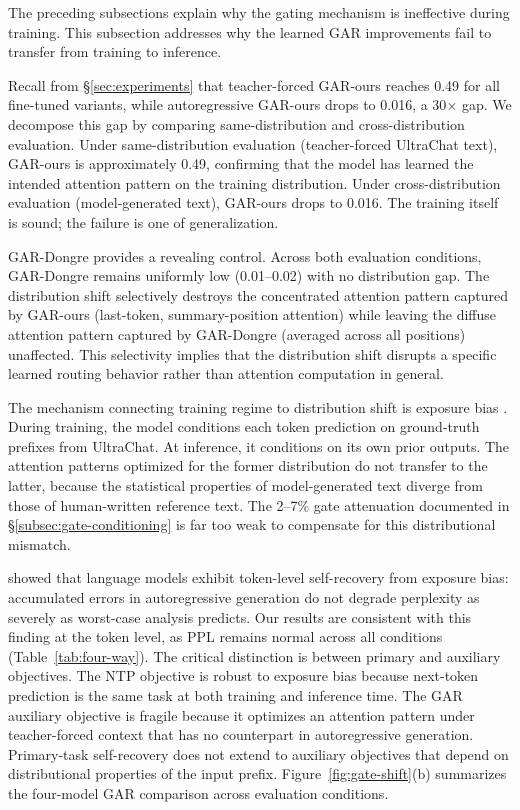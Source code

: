 The preceding subsections explain why the gating mechanism is ineffective during training. This subsection addresses why the learned GAR improvements fail to transfer from training to inference.

Recall from \S\ref{sec:experiments} that teacher-forced GAR-ours reaches 0.49 for all fine-tuned variants, while autoregressive GAR-ours drops to 0.016, a 30$\times$ gap. We decompose this gap by comparing same-distribution and cross-distribution evaluation. Under same-distribution evaluation (teacher-forced UltraChat text), GAR-ours is approximately 0.49, confirming that the model has learned the intended attention pattern on the training distribution. Under cross-distribution evaluation (model-generated text), GAR-ours drops to 0.016. The training itself is sound; the failure is one of generalization.

GAR-Dongre provides a revealing control. Across both evaluation conditions, GAR-Dongre remains uniformly low (0.01--0.02) with no distribution gap. The distribution shift selectively destroys the concentrated attention pattern captured by GAR-ours (last-token, summary-position attention) while leaving the diffuse attention pattern captured by GAR-Dongre (averaged across all positions) unaffected. This selectivity implies that the distribution shift disrupts a specific learned routing behavior rather than attention computation in general.

The mechanism connecting training regime to distribution shift is exposure bias \citep{bengio2015scheduled}. During training, the model conditions each token prediction on ground-truth prefixes from UltraChat. At inference, it conditions on its own prior outputs. The attention patterns optimized for the former distribution do not transfer to the latter, because the statistical properties of model-generated text diverge from those of human-written reference text. The 2--7\% gate attenuation documented in \S\ref{subsec:gate-conditioning} is far too weak to compensate for this distributional mismatch.

\citet{he2019exposure} showed that language models exhibit token-level self-recovery from exposure bias: accumulated errors in autoregressive generation do not degrade perplexity as severely as worst-case analysis predicts. Our results are consistent with this finding at the token level, as PPL remains normal across all conditions (Table~\ref{tab:four-way}). The critical distinction is between primary and auxiliary objectives. The NTP objective is robust to exposure bias because next-token prediction is the same task at both training and inference time. The GAR auxiliary objective is fragile because it optimizes an attention pattern under teacher-forced context that has no counterpart in autoregressive generation. Primary-task self-recovery does not extend to auxiliary objectives that depend on distributional properties of the input prefix. Figure~\ref{fig:gate-shift}(b) summarizes the four-model GAR comparison across evaluation conditions.